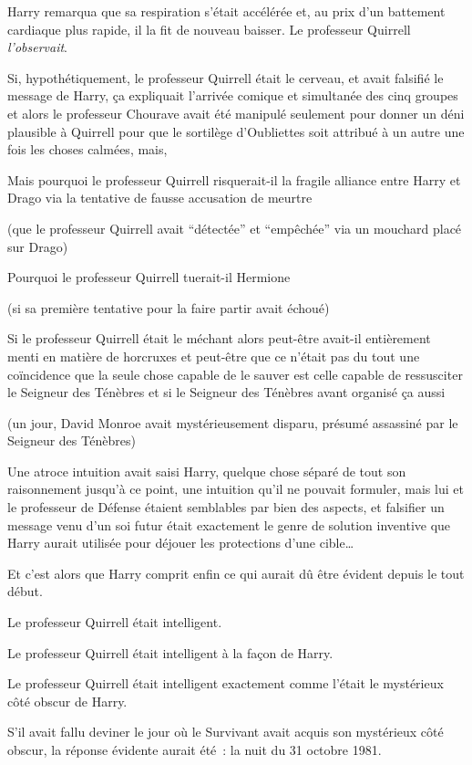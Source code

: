 Harry remarqua que sa respiration s'était accélérée et, au prix d'un battement cardiaque plus rapide, il la fit de nouveau baisser. Le professeur Quirrell \emph{l'observait}.

Si, hypothétiquement, le professeur Quirrell était le cerveau, et avait falsifié le message de Harry, ça expliquait l'arrivée comique et simultanée des cinq groupes et alors le professeur Chourave avait été manipulé seulement pour donner un déni plausible à Quirrell pour que le sortilège d'Oubliettes soit attribué à un autre une fois les choses calmées, mais,

Mais pourquoi le professeur Quirrell risquerait-il la fragile alliance entre Harry et Drago via la tentative de fausse accusation de meurtre

(que le professeur Quirrell avait “détectée” et “empêchée” via un mouchard placé sur Drago)

Pourquoi le professeur Quirrell tuerait-il Hermione

(si sa première tentative pour la faire partir avait échoué)

Si le professeur Quirrell était le méchant alors peut-être avait-il entièrement menti en matière de horcruxes et peut-être que ce n'était pas du tout une coïncidence que la seule chose capable de le sauver est celle capable de ressusciter le Seigneur des Ténèbres et si le Seigneur des Ténèbres avant organisé ça aussi

(un jour, David Monroe avait mystérieusement disparu, présumé assassiné par le Seigneur des Ténèbres)

Une atroce intuition avait saisi Harry, quelque chose séparé de tout son raisonnement jusqu'à ce point, une intuition qu'il ne pouvait formuler, mais lui et le professeur de Défense étaient semblables par bien des aspects, et falsifier un message venu d'un soi futur était exactement le genre de solution inventive que Harry aurait utilisée pour déjouer les protections d'une cible…

Et c'est alors que Harry comprit enfin ce qui aurait dû être évident depuis le tout début.

\later

Le professeur Quirrell était intelligent.

Le professeur Quirrell était intelligent à la façon de Harry.

Le professeur Quirrell était intelligent exactement comme l'était le mystérieux côté obscur de Harry.

S'il avait fallu deviner le jour où le Survivant avait acquis son mystérieux côté obscur, la réponse évidente aurait été~: la nuit du 31 octobre 1981.

